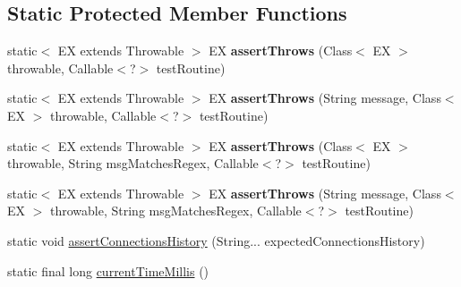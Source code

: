 \subsection*{Static Protected Member Functions}
\begin{DoxyCompactItemize}
\item 
\mbox{\label{classtestsuite_1_1_base_test_case_ae34ffd921f16370341c4e642181840da}} 
static$<$ EX extends Throwable $>$ EX {\bfseries assert\+Throws} (Class$<$ EX $>$ throwable, Callable$<$?$>$ test\+Routine)
\item 
\mbox{\label{classtestsuite_1_1_base_test_case_aeb8b95d92ca70c6308fbf4f5bf701286}} 
static$<$ EX extends Throwable $>$ EX {\bfseries assert\+Throws} (String message, Class$<$ EX $>$ throwable, Callable$<$?$>$ test\+Routine)
\item 
\mbox{\label{classtestsuite_1_1_base_test_case_a4374e9b5e46f33c84aefeb7d5d7e49d5}} 
static$<$ EX extends Throwable $>$ EX {\bfseries assert\+Throws} (Class$<$ EX $>$ throwable, String msg\+Matches\+Regex, Callable$<$?$>$ test\+Routine)
\item 
\mbox{\label{classtestsuite_1_1_base_test_case_a933e368e79298cfda4960166ec2b078c}} 
static$<$ EX extends Throwable $>$ EX {\bfseries assert\+Throws} (String message, Class$<$ EX $>$ throwable, String msg\+Matches\+Regex, Callable$<$?$>$ test\+Routine)
\item 
static void \mbox{\hyperlink{classtestsuite_1_1_base_test_case_aca5533ef294301b97ad9d54a7edf825f}{assert\+Connections\+History}} (String... expected\+Connections\+History)
\item 
static final long \mbox{\hyperlink{classtestsuite_1_1_base_test_case_a48d748cca7b09172b6e5e2fac15c6bc7}{current\+Time\+Millis}} ()
\end{DoxyCompactItemize}

